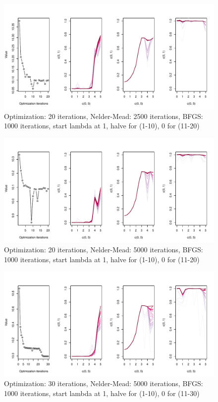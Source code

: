 \documentclass[12pt, oneside, titlepage]{article}   	%
\begin{document}
 \begin{figure}[h]
   \centering
       \includegraphics[width=1\textwidth]{../unbranched-determinate-convergence-2500-1000-lambda0-2.pdf}  
    \caption{ Optimization: 20 iterations, Nelder-Mead: 2500 iterations, BFGS: 1000 iterations, start lambda at 1, halve for (1-10), 0 for (11-20)  }
 \label{fig:test}
\end{figure}

 \begin{figure}[h]
   \centering
       \includegraphics[width=1\textwidth]{../unbranched-determinate-convergence-5000-1000-lambda0-2.pdf}  
    \caption{ Optimization: 20 iterations, Nelder-Mead: 5000 iterations, BFGS: 1000 iterations, start lambda at 1, halve for (1-10), 0 for (11-20) }
 \label{fig:test}
\end{figure}

 \begin{figure}[h]
   \centering
       \includegraphics[width=1\textwidth]{../unbranched-determinate-convergence2500-1000-30iter-2.pdf}  
    \caption{ Optimization: 30 iterations, Nelder-Mead: 5000 iterations, BFGS: 1000 iterations, start lambda at 1, halve for (1-10), 0 for (11-30) }
 \label{fig:test}
\end{figure}
\end{document}
